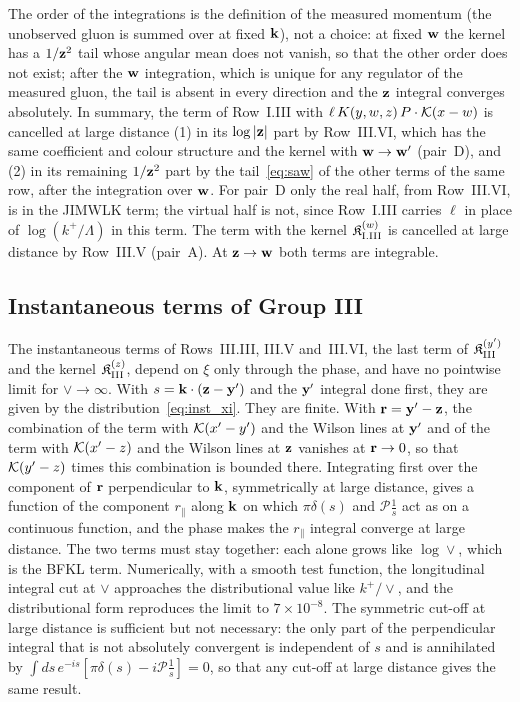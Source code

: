 The order of the integrations is the definition of the measured momentum (the unobserved gluon is summed over at fixed $\mathbf{k}$), not a choice: at fixed $\mathbf{w}$ the kernel has a $1/\mathbf{z}^2$ tail whose angular mean does not vanish, so that the other order does not exist; after the $\mathbf{w}$ integration, which is unique for any regulator of the measured gluon, the tail is absent in every direction and the $\mathbf{z}$ integral converges absolutely. In summary, the term of Row~I.III with $\ell\,K(y,w,z)\,P\cdot\mathcal{K}(x-w)$ is cancelled at large distance (1) in its $\log|\mathbf{z}|$ part by Row~III.VI, which has the same coefficient and colour structure and the kernel with $\mathbf{w}\to\mathbf{w}'$ (pair~D), and (2) in its remaining $1/\mathbf{z}^2$ part by the tail~\eqref{eq:saw} of the other terms of the same row, after the integration over $\mathbf{w}$. For pair~D only the real half, from Row~III.VI, is in the JIMWLK term; the virtual half is not, since Row~I.III carries $\ell$ in place of $\log(k^+/\Lambda)$ in this term. The term with the kernel $\mathfrak K^{(w)}_{\rm I.III}$ is cancelled at large distance by Row~III.V (pair~A). At $\mathbf{z}\to\mathbf{w}$ both terms are integrable.

\subsection{Instantaneous terms of Group III}\label{sec:fin_inst}

The instantaneous terms of Rows~III.III, III.V and~III.VI, the last term of $\mathfrak K^{(y')}_{\rm III}$ and the kernel $\mathfrak K^{(z)}_{\rm III}$, depend on $\xi$ only through the phase, and have no pointwise limit for $\vee\to\infty$. With $s=\mathbf{k}\cdot(\mathbf{z}-\mathbf{y}')$ and the $\mathbf{y}'$ integral done first, they are given by the distribution~\eqref{eq:inst_xi}. They are finite. With $\mathbf{r}=\mathbf{y}'-\mathbf{z}$, the combination of the term with $\mathcal{K}(x'-y')$ and the Wilson lines at $\mathbf{y}'$ and of the term with $\mathcal{K}(x'-z)$ and the Wilson lines at $\mathbf{z}$ vanishes at $\mathbf{r}\to0$, so that $\mathcal{K}(y'-z)$ times this combination is bounded there. Integrating first over the component of $\mathbf{r}$ perpendicular to $\mathbf{k}$, symmetrically at large distance, gives a function of the component $r_\parallel$ along $\mathbf{k}$ on which $\pi\delta(s)$ and $\mathcal P\frac1s$ act as on a continuous function, and the phase makes the $r_\parallel$ integral converge at large distance. The two terms must stay together: each alone grows like $\log\vee$, which is the BFKL term. Numerically, with a smooth test function, the longitudinal integral cut at $\vee$ approaches the distributional value like $k^+/\vee$, and the distributional form reproduces the limit to $7\times10^{-8}$. The symmetric cut-off at large distance is sufficient but not necessary: the only part of the perpendicular integral that is not absolutely convergent is independent of $s$ and is annihilated by $\int ds\,e^{-is}[\pi\delta(s)-i\mathcal P\frac1s]=0$, so that any cut-off at large distance gives the same result.

